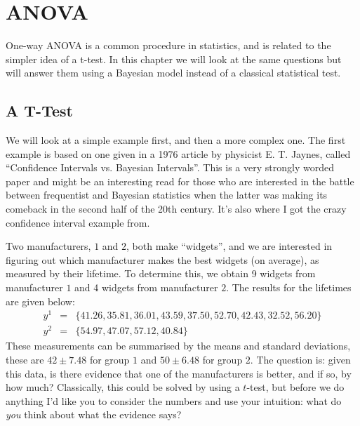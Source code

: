 \chapter{ANOVA}
One-way ANOVA is a common procedure in statistics, and is related to the
simpler idea of a t-test. In this chapter we will look at the same questions
but will answer them using a Bayesian model instead of a classical statistical
test.

\section{A T-Test}
We will look at a simple example first, and then a more complex one.
The first example is based on one given in a 1976 article by physicist E. T. Jaynes,
called ``Confidence Intervals vs. Bayesian Intervals''. This is a very strongly
worded paper and might be an interesting read for
those who are interested in the battle between frequentist and Bayesian statistics
when the latter was making its comeback in the second half of the 20th century.
It's also where I got the crazy confidence interval example from.

Two manufacturers, $1$ and $2$, both make ``widgets'', and we are interested
in figuring out which manufacturer makes the best widgets (on average), as
measured by their lifetime. To determine this, we obtain 9 widgets from
manufacturer $1$ and 4 widgets from manufacturer $2$. The results for the
lifetimes are given below:
\begin{eqnarray}
y^1 &=& \{41.26, 35.81, 36.01, 43.59, 37.50, 52.70, 42.43, 32.52, 56.20\}\\
y^2 &=& \{54.97, 47.07, 57.12, 40.84\}
\end{eqnarray}
These measurements can be summarised by the means and standard deviations, these
are $42 \pm 7.48$ for group $1$ and $50 \pm 6.48$ for group $2$.
The question is: given this data, is there evidence that one of the manufacturers
is better, and if so, by how much? Classically, this could be solved by using a
$t$-test, but before we do anything I'd like you to consider the numbers and
use your intuition: what do {\it you} think about what the evidence says?

